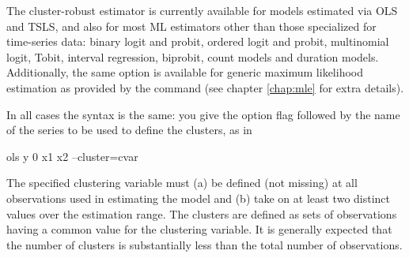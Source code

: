 The cluster-robust estimator is currently available for models
estimated via OLS and TSLS, and also for most ML estimators other than
those specialized for time-series data: binary logit and probit,
ordered logit and probit, multinomial logit, Tobit, interval
regression, biprobit, count models and duration models. Additionally,
the same option is available for generic maximum likelihood estimation
as provided by the  command (see chapter \ref{chap:mle} for
extra details).

In all cases the syntax is the same: you give the option flag
 followed by the name of the series to be used to
define the clusters, as in
%
\begin{code}
ols y 0 x1 x2 --cluster=cvar
\end{code}
%
The specified clustering variable must (a) be defined (not missing) at
all observations used in estimating the model and (b) take on at least
two distinct values over the estimation range. The clusters are
defined as sets of observations having a common value for the
clustering variable. It is generally expected that the number of
clusters is substantially less than the total number of observations.



